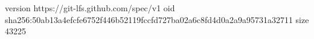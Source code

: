 version https://git-lfs.github.com/spec/v1
oid sha256:50ab13a4efcfe6752f446b52119fccfd727ba02a6c8fd4d0a2a9a95731a32711
size 43225
